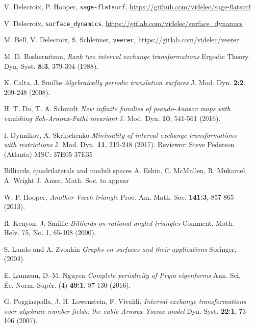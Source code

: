 \documentclass[a4paper,12pt]{article}
\begin{document}
\begin{thebibliography}{sage-flatsurf}

V. Delecroix, P. Hooper,
\texttt{sage-flatsurf},
\url{https://github.com/videlec/sage-flatsurf}

V. Delecroix,
\texttt{surface\_dynamics},
\url{https://gitlab.com/videlec/surface_dynamics}

M. Bell, V. Delecroix, S. Schleimer,
\texttt{veerer},
\url{https://gitlab.com/videlec/veerer}

M. D. Boshernitzan,
\textit{Rank two interval exchange transformations}
Ergodic Theory Dyn. Syst. \textbf{8:3}, 379-394 (1988).

K. Calta, J. Smillie
\textit{Algebraically periodic translation surfaces}
J. Mod. Dyn. \textbf{2:2}, 209-248 (2008).

H. T. Do, T. A. Schmidt
\textit{New infinite families of pseudo-Anosov maps with vanishing Sah-Arnoux-Fathi invariant}
J. Mod. Dyn. \textbf{10}, 541-561 (2016).

I. Dynnikov, A. Skripchenko
\textit{Minimality of interval exchange transformations with restrictions}
J. Mod. Dyn. \textbf{11}, 219-248 (2017).
Reviewer: Steve Pederson (Atlanta)
MSC:  37E05 37E35

Billiards, quadrilaterals and moduli spaces
A. Eskin, C. McMullen, R. Mukamel, A. Wright
J. Amer. Math. Soc. to appear

W. P. Hooper,
\textit{Another Veech triangle}
Proc. Am. Math. Soc. \textbf{141:3}, 857-865 (2013).

R. Kenyon, J. Smillie
\textit{Billiards on rational-angled triangles}
Comment. Math. Helv. 75, No. 1, 65-108 (2000).

S. Lando and A. Zvonkin
\textit{Graphs on surfaces and their applications}
Springer, (2004).

E. Lanneau, D.-M. Nguyen
\textit{Complete periodicity of Prym eigenforms}
Ann. Sci. Éc. Norm. Supér. (4) \textbf{49:1}, 87-130 (2016).

G. Poggiaspalla, J. H. Lowenstein, F. Vivaldi,
\textit{Interval exchange transformations over algebraic number fields: the cubic Arnoux-Yoccoz model}
Dyn. Syst. \textbf{22:1}, 73-106 (2007).


\end{thebibliography}
\end{document}
